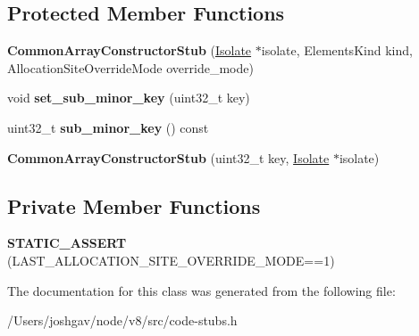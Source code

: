 \subsection*{Protected Member Functions}
\begin{DoxyCompactItemize}
\item 
{\bfseries Common\+Array\+Constructor\+Stub} (\hyperlink{classv8_1_1internal_1_1_isolate}{Isolate} $\ast$isolate, Elements\+Kind kind, Allocation\+Site\+Override\+Mode override\+\_\+mode)\hypertarget{classv8_1_1internal_1_1_common_array_constructor_stub_a644359376d4f78a62c4b0bf3632ad8a9}{}\label{classv8_1_1internal_1_1_common_array_constructor_stub_a644359376d4f78a62c4b0bf3632ad8a9}

\item 
void {\bfseries set\+\_\+sub\+\_\+minor\+\_\+key} (uint32\+\_\+t key)\hypertarget{classv8_1_1internal_1_1_common_array_constructor_stub_a3ab1b574bd00963011c027999e777a4b}{}\label{classv8_1_1internal_1_1_common_array_constructor_stub_a3ab1b574bd00963011c027999e777a4b}

\item 
uint32\+\_\+t {\bfseries sub\+\_\+minor\+\_\+key} () const \hypertarget{classv8_1_1internal_1_1_common_array_constructor_stub_abd7af2627f1f6fc45c271e91c10eae2f}{}\label{classv8_1_1internal_1_1_common_array_constructor_stub_abd7af2627f1f6fc45c271e91c10eae2f}

\item 
{\bfseries Common\+Array\+Constructor\+Stub} (uint32\+\_\+t key, \hyperlink{classv8_1_1internal_1_1_isolate}{Isolate} $\ast$isolate)\hypertarget{classv8_1_1internal_1_1_common_array_constructor_stub_aaafb26fda3e2c3631462f7a50bc0296e}{}\label{classv8_1_1internal_1_1_common_array_constructor_stub_aaafb26fda3e2c3631462f7a50bc0296e}

\end{DoxyCompactItemize}
\subsection*{Private Member Functions}
\begin{DoxyCompactItemize}
\item 
{\bfseries S\+T\+A\+T\+I\+C\+\_\+\+A\+S\+S\+E\+RT} (L\+A\+S\+T\+\_\+\+A\+L\+L\+O\+C\+A\+T\+I\+O\+N\+\_\+\+S\+I\+T\+E\+\_\+\+O\+V\+E\+R\+R\+I\+D\+E\+\_\+\+M\+O\+DE==1)\hypertarget{classv8_1_1internal_1_1_common_array_constructor_stub_a991b69d5688c6564c2fe10dba29dd0e6}{}\label{classv8_1_1internal_1_1_common_array_constructor_stub_a991b69d5688c6564c2fe10dba29dd0e6}

\end{DoxyCompactItemize}


The documentation for this class was generated from the following file\+:\begin{DoxyCompactItemize}
\item 
/\+Users/joshgav/node/v8/src/code-\/stubs.\+h\end{DoxyCompactItemize}
